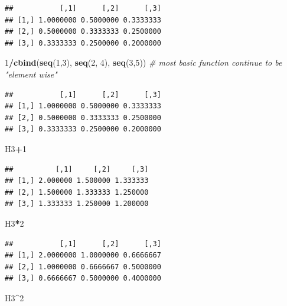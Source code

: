 \documentclass[]{article}
\newenvironment{Shaded}{\begin{snugshade}}{\end{snugshade}}
\newcommand{\KeywordTok}[1]{\textcolor[rgb]{0.13,0.29,0.53}{\textbf{#1}}}
\newcommand{\DecValTok}[1]{\textcolor[rgb]{0.00,0.00,0.81}{#1}}
\newcommand{\CommentTok}[1]{\textcolor[rgb]{0.56,0.35,0.01}{\textit{#1}}}
\newcommand{\OperatorTok}[1]{\textcolor[rgb]{0.81,0.36,0.00}{\textbf{#1}}}
\newcommand{\NormalTok}[1]{#1}
\begin{document}
\begin{verbatim}
##           [,1]      [,2]      [,3]
## [1,] 1.0000000 0.5000000 0.3333333
## [2,] 0.5000000 0.3333333 0.2500000
## [3,] 0.3333333 0.2500000 0.2000000
\end{verbatim}

\begin{Shaded}
\begin{Highlighting}[]
\DecValTok{1}\OperatorTok{/}\KeywordTok{cbind}\NormalTok{(}\KeywordTok{seq}\NormalTok{(}\DecValTok{1}\NormalTok{,}\DecValTok{3}\NormalTok{), }\KeywordTok{seq}\NormalTok{(}\DecValTok{2}\NormalTok{, }\DecValTok{4}\NormalTok{), }\KeywordTok{seq}\NormalTok{(}\DecValTok{3}\NormalTok{,}\DecValTok{5}\NormalTok{)) }\CommentTok{# most basic function continue to be "element wise"}
\end{Highlighting}
\end{Shaded}

\begin{verbatim}
##           [,1]      [,2]      [,3]
## [1,] 1.0000000 0.5000000 0.3333333
## [2,] 0.5000000 0.3333333 0.2500000
## [3,] 0.3333333 0.2500000 0.2000000
\end{verbatim}

\begin{Shaded}
\begin{Highlighting}[]
\NormalTok{H3}\OperatorTok{+}\DecValTok{1}
\end{Highlighting}
\end{Shaded}

\begin{verbatim}
##          [,1]     [,2]     [,3]
## [1,] 2.000000 1.500000 1.333333
## [2,] 1.500000 1.333333 1.250000
## [3,] 1.333333 1.250000 1.200000
\end{verbatim}

\begin{Shaded}
\begin{Highlighting}[]
\NormalTok{H3}\OperatorTok{*}\DecValTok{2}
\end{Highlighting}
\end{Shaded}

\begin{verbatim}
##           [,1]      [,2]      [,3]
## [1,] 2.0000000 1.0000000 0.6666667
## [2,] 1.0000000 0.6666667 0.5000000
## [3,] 0.6666667 0.5000000 0.4000000
\end{verbatim}

\begin{Shaded}
\begin{Highlighting}[]
\NormalTok{H3}\OperatorTok{^}\DecValTok{2}
\end{Highlighting}
\end{Shaded}
\end{document}
